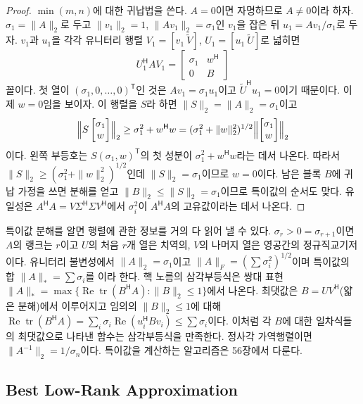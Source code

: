 \begin{proof}
$\min(m,n)$에 대한 귀납법을 쓴다. $A=0$이면 자명하므로 $A\ne0$이라 하자. $\sigma_1=\|A\|_2$로 두고 $\|v_1\|_2=1$, $\|Av_1\|_2=\sigma_1$인 $v_1$을 잡은 뒤 $u_1=Av_1/\sigma_1$로 두자. $v_1$과 $u_1$을 각각 유니터리 행렬 $V_1=[v_1\ \widetilde V]$, $U_1=[u_1\ \widetilde U]$로 넓히면
\[
U_1^{\mathsf H}AV_1=\begin{bmatrix}\sigma_1&w^{\mathsf H}\\0&B\end{bmatrix}
\]
꼴이다. 첫 열이 $(\sigma_1,0,\dots,0)^{\mathsf T}$인 것은 $Av_1=\sigma_1u_1$이고 $\widetilde U^{\mathsf H}u_1=0$이기 때문이다. 이제 $w=0$임을 보이자. 이 행렬을 $S$라 하면 $\|S\|_2=\|A\|_2=\sigma_1$이고
\[
\Bigl\|S\begin{bmatrix}\sigma_1\\w\end{bmatrix}\Bigr\|_2\ge\sigma_1^2+w^{\mathsf H}w=(\sigma_1^2+\|w\|_2^2)^{1/2}\Bigl\|\begin{bmatrix}\sigma_1\\w\end{bmatrix}\Bigr\|_2
\]
이다. 왼쪽 부등호는 $S(\sigma_1,w)^{\mathsf T}$의 첫 성분이 $\sigma_1^2+w^{\mathsf H}w$라는 데서 나온다. 따라서 $\|S\|_2\ge(\sigma_1^2+\|w\|_2^2)^{1/2}$인데 $\|S\|_2=\sigma_1$이므로 $w=0$이다. 남은 블록 $B$에 귀납 가정을 쓰면 분해를 얻고 $\|B\|_2\le\|S\|_2=\sigma_1$이므로 특이값의 순서도 맞다. 유일성은 $A^{\mathsf H}A=V\Sigma^{\mathsf H}\Sigma V^{\mathsf H}$에서 $\sigma_i^2$이 $A^{\mathsf H}A$의 고유값이라는 데서 나온다.
\end{proof}

특이값 분해를 알면 행렬에 관한 정보를 거의 다 읽어 낼 수 있다. $\sigma_r>0=\sigma_{r+1}$이면 $A$의 랭크는 $r$이고 $U$의 처음 $r$개 열은 치역의, $V$의 나머지 열은 영공간의 정규직교기저이다. 유니터리 불변성에서 $\|A\|_2=\sigma_1$이고 $\|A\|_F=(\sum\sigma_i^2)^{1/2}$이며 특이값의 합 $\|A\|_*=\sum\sigma_i$를 이라 한다. 핵 노름의 삼각부등식은 쌍대 표현 $\|A\|_*=\max\{\operatorname{Re}\operatorname{tr}(B^{\mathsf H}A):\|B\|_2\le1\}$에서 나온다. 최댓값은 $B=UV^{\mathsf H}$(얇은 분해)에서 이루어지고 임의의 $\|B\|_2\le1$에 대해 $\operatorname{Re}\operatorname{tr}(B^{\mathsf H}A)=\sum_i\sigma_i\operatorname{Re}(u_i^{\mathsf H}Bv_i)\le\sum\sigma_i$이다. 이처럼 각 $B$에 대한 일차식들의 최댓값으로 나타낸 함수는 삼각부등식을 만족한다. 정사각 가역행렬이면 $\|A^{-1}\|_2=1/\sigma_n$이다. 특이값을 계산하는 알고리즘은 56장에서 다룬다.

\subsection{Best Low-Rank Approximation}


